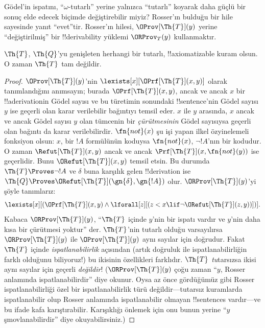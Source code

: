 \documentclass[../../../include/open-logic-section]{subfiles}
\begin{document}


G\"odel'in ispatını, ``$\omega$-tutarlı'' yerine yalnızca ``tutarlı''
koyarak daha güçlü bir sonuç elde edecek biçimde değiştirebilir miyiz?
Rosser'ın bulduğu bir hile sayesinde yanıt ``evet''tir. Rosser'ın hilesi,
$\OProv[\Th{T}](y)$ yerine ``değiştirilmiş'' bir !!{derivability} yüklemi
$\ORProv_T(y)$ kullanmaktır.

\begin{thm}
$\Th{T}$, $\Th{Q}$'yu genişleten herhangi bir tutarlı, !!{axiomatizable}
kuram olsun. O zaman $\Th{T}$ tam değildir.
\end{thm}

\begin{proof}
$\OProv[\Th{T}](y)$'nin $\lexists[x][\OPrf[\Th{T}](x,y)]$ olarak
tanımlandığını anımsayın; burada $\OPrf[\Th{T}](x,y)$, ancak ve ancak $x$ bir
!!a{derivation}{}in G\"odel sayısı ve bu türetimin sonundaki !!{sentence}'nin
G\"odel sayısı $y$ ise geçerli olan karar verilebilir bağıntıyı temsil eder. $x$ ile $y$
arasında, $x$ ancak ve ancak G\"odel sayısı $y$ olan tümcenin bir
\emph{çürütmesinin} G\"odel sayısıysa geçerli olan bağıntı da karar
verilebilirdir. $\fn{not}(x)$ şu işi yapan ilkel özyinelemeli fonksiyon olsun:
$x$, bir $!A$ formülünün koduysa $\fn{not}(x)$, $\lnot !A$'nın bir kodudur.
O zaman $\Refut[\Th{T}](x,y)$ ancak ve ancak
$\Prf[\Th{T}](x,\fn{not}(y))$ ise geçerlidir. Bunu
$\ORefut[\Th{T}](x,y)$ temsil etsin. Bu durumda $\Th{T} \Proves \lnot !A$
ve $\delta$ buna karşılık gelen !!{derivation} ise
$\Th{Q} \Proves \ORefut[\Th{T}](\gn{\delta},\gn{!A})$ olur.
$\ORProv[\Th{T}](y)$'yi şöyle tanımlarız:
\[
\lexists[x][(\OPrf[\Th{T}](x,y) \land \lforall[z][(z < x \lif \lnot
  \ORefut[\Th{T}](z,y))])].
\]
Kabaca $\ORProv[\Th{T}](y)$, ``$\Th{T}$ içinde $y$'nin bir ispatı vardır ve
$y$'nin daha kısa bir çürütmesi yoktur'' der. $\Th{T}$'nin tutarlı olduğu
varsayılırsa $\ORProv[\Th{T}](y)$ ile $\OProv[\Th{T}](y)$ aynı sayılar için
doğrudur. Fakat $\Th{T}$ içinde \emph{ispatlanabilirlik} açısından (artık
doğruluk ile ispatlanabilirliğin farklı olduğunu biliyoruz!) bu ikisinin
özellikleri farklıdır. $\Th{T}$ \emph{tu}tarsızsa ikisi aynı sayılar için
geçerli \emph{değildir}!{} ($\ORProv[\Th{T}](y)$ çoğu zaman ``$y$, Rosser
anlamında ispatlanabilirdir'' diye okunur. Oysa az önce gördüğümüz gibi Rosser
ispatlanabilirliği özel bir ispatlanabilirlik türü değildir---tutarsız
kuramlarda ispatlanabilir olup Rosser anlamında ispatlanabilir olmayan
!!{sentence}s vardır---ve bu ifade kafa karıştırabilir. Karışıklığı önlemek
için onu bunun yerine ``$y$ şmovlanabilirdir'' diye okuyabilirsiniz.)


\end{proof}
\end{document}
